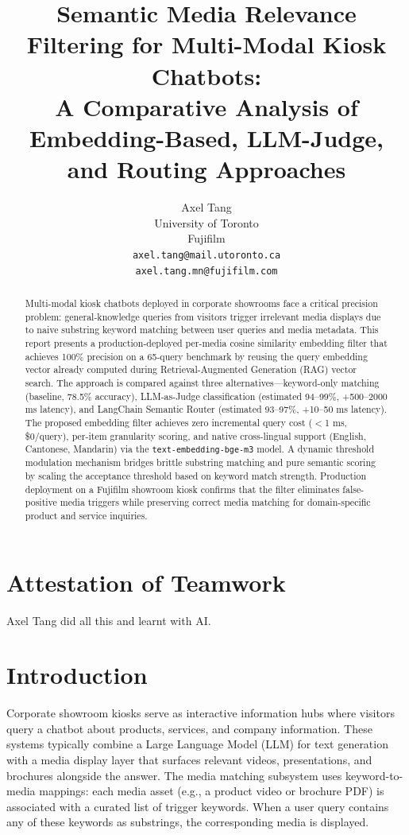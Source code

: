 \documentclass{article}
\title{Semantic Media Relevance Filtering for Multi-Modal Kiosk Chatbots:\\
A Comparative Analysis of Embedding-Based, LLM-Judge, and Routing Approaches}
\author{%
  Axel Tang\\
  University of Toronto\\
  Fujifilm\\
  \texttt{axel.tang@mail.utoronto.ca}\\
  \texttt{axel.tang.mn@fujifilm.com}\\
}
\begin{document}
\maketitle

\begin{abstract}
  Multi-modal kiosk chatbots deployed in corporate showrooms face a critical precision problem: general-knowledge queries from visitors trigger irrelevant media displays due to naive substring keyword matching between user queries and media metadata. This report presents a production-deployed per-media cosine similarity embedding filter that achieves 100\% precision on a 65-query benchmark by reusing the query embedding vector already computed during Retrieval-Augmented Generation (RAG) vector search. The approach is compared against three alternatives—keyword-only matching (baseline, 78.5\% accuracy), LLM-as-Judge classification (estimated 94--99\%, +500--2000 ms latency), and LangChain Semantic Router (estimated 93--97\%, +10--50 ms latency). The proposed embedding filter achieves zero incremental query cost ($<$1 ms, \$0/query), per-item granularity scoring, and native cross-lingual support (English, Cantonese, Mandarin) via the \texttt{text-embedding-bge-m3} model. A dynamic threshold modulation mechanism bridges brittle substring matching and pure semantic scoring by scaling the acceptance threshold based on keyword match strength. Production deployment on a Fujifilm showroom kiosk confirms that the filter eliminates false-positive media triggers while preserving correct media matching for domain-specific product and service inquiries.
\end{abstract}

\section*{Attestation of Teamwork}
Axel Tang did all this and learnt with AI.

\section{Introduction}

Corporate showroom kiosks serve as interactive information hubs where visitors query a chatbot about products, services, and company information. These systems typically combine a Large Language Model (LLM) for text generation with a media display layer that surfaces relevant videos, presentations, and brochures alongside the answer. The media matching subsystem uses keyword-to-media mappings: each media asset (e.g., a product video or brochure PDF) is associated with a curated list of trigger keywords. When a user query contains any of these keywords as substrings, the corresponding media is displayed.
\end{document}

